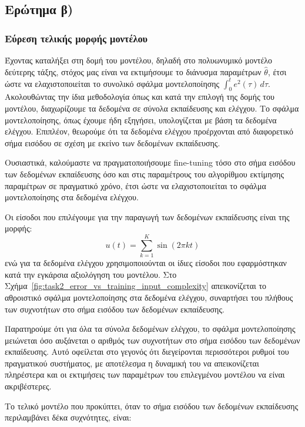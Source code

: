 \documentclass[a4paper,12pt]{article}
\begin{document}
\subsection*{Ερώτημα β)}

\subsubsection*{Εύρεση τελικής μορφής μοντέλου}

Έχοντας καταλήξει στη δομή του μοντέλου, δηλαδή στο πολυωνυμικό μοντέλο δεύτερης τάξης, στόχος μας είναι 
να εκτιμήσουμε το διάνυσμα παραμέτρων $\hat{\theta}$, έτσι ώστε να ελαχιστοποιείται το συνολικό σφάλμα 
μοντελοποίησης $\int_0^t e^2(\tau)\,d\tau$. Ακολουθώντας την ίδια μεθοδολογία όπως και κατά την επιλογή 
της δομής του μοντέλου, διαχωρίζουμε τα δεδομένα σε σύνολα εκπαίδευσης και ελέγχου. Το σφάλμα μοντελοποίησης, 
όπως έχουμε ήδη εξηγήσει, υπολογίζεται με βάση τα δεδομένα ελέγχου. Επιπλέον, θεωρούμε ότι τα δεδομένα 
ελέγχου προέρχονται από διαφορετικό σήμα εισόδου σε σχέση με εκείνο των δεδομένων εκπαίδευσης. 

Ουσιαστικά, καλούμαστε να πραγματοποιήσουμε fine-tuning τόσο 
στο σήμα εισόδου των δεδομένων εκπαίδευσης όσο και στις παραμέτρους του αλγορίθμου εκτίμησης παραμέτρων 
σε πραγματικό χρόνο, έτσι ώστε να ελαχιστοποιείται το σφάλμα μοντελοποίησης στα δεδομένα ελέγχου.

Οι είσοδοι που επιλέγουμε για την παραγωγή των δεδομένων εκπαίδευσης είναι της μορφής:
\[
    u(t) = \sum_{k=1}^K \sin(2 \pi kt)
\]
ενώ για τα δεδομένα ελέγχου χρησιμοποιούνται οι ίδιες είσοδοι που εφαρμόστηκαν κατά την εγκάρσια 
αξιολόγηση του μοντέλου. Στο Σχήμα~\ref{fig:task2_error_vs_training_input_complexity} απεικονίζεται το 
αθροιστικό σφάλμα μοντελοποίησης στα δεδομένα ελέγχου, συναρτήσει του πλήθους των συχνοτήτων στο σήμα 
εισόδου των δεδομένων εκπαίδευσης.

Παρατηρούμε ότι για όλα τα σύνολα δεδομένων ελέγχου, το σφάλμα μοντελοποίησης μειώνεται όσο αυξάνεται ο 
αριθμός των συχνοτήτων στο σήμα εισόδου των δεδομένων εκπαίδευσης. Αυτό οφείλεται στο γεγονός ότι 
διεγείρονται περισσότεροι ρυθμοί του πραγματικού συστήματος, με αποτέλεσμα η δυναμική του να απεικονίζεται 
πληρέστερα και οι εκτιμήσεις των παραμέτρων του επιλεγμένου μοντέλου να είναι ακριβέστερες. 

Το τελικό μοντέλο που προκύπτει, όταν το σήμα εισόδου των δεδομένων εκπαίδευσης περιλαμβάνει δέκα συχνότητες,
είναι:
\end{document}
